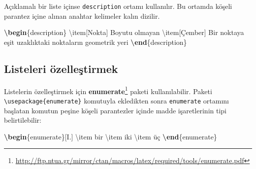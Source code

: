 \documentclass[
  10pt,
]{scrbook}
\newenvironment{Shaded}{}{}
\newcommand{\ExtensionTok}[1]{#1}
\newcommand{\FunctionTok}[1]{\textcolor[rgb]{0.02,0.16,0.49}{#1}}
\newcommand{\KeywordTok}[1]{\textcolor[rgb]{0.00,0.44,0.13}{\textbf{#1}}}
\newcommand{\NormalTok}[1]{#1}
\newcommand{\SpecialCharTok}[1]{\textcolor[rgb]{0.25,0.44,0.63}{#1}}
\newcommand{\SpecialStringTok}[1]{\textcolor[rgb]{0.73,0.40,0.53}{#1}}
\renewcommand{\href}[2]{#2\footnote{\url{#1}}}
\theoremstyle{definition}
\theoremstyle{definition}
\theoremstyle{definition}
\theoremstyle{definition}
\theoremstyle{remark}
\begin{document}
\begin{Shaded}
\end{Shaded}

Açıklamalı bir liste içinse \texttt{description} ortamı kullanılır. Bu ortamda köşeli parantez içine alınan anahtar kelimeler kalın dizilir.

\begin{Shaded}
\begin{Highlighting}[]
\KeywordTok{\textbackslash{}begin}\NormalTok{\{}\ExtensionTok{description}\NormalTok{\}}
  \FunctionTok{\textbackslash{}item}\NormalTok{[Nokta] Boyutu olmayan}
  \FunctionTok{\textbackslash{}item}\NormalTok{[Çember] Bir noktaya eşit}
\NormalTok{  uzaklıktaki noktaların geometrik yeri}
\KeywordTok{\textbackslash{}end}\NormalTok{\{}\ExtensionTok{description}\NormalTok{\}}
\end{Highlighting}
\end{Shaded}

\hypertarget{listeleri-uxf6zelleux15ftirmek}{%
\subsection{Listeleri özelleştirmek}\label{listeleri-uxf6zelleux15ftirmek}}

Listelerin özelleştirmek için \href{http://ftp.ntua.gr/mirror/ctan/macros/latex/required/tools/enumerate.pdf}{\textbf{enumerate}} paketi kullanılabilir. Paketi \texttt{\textbackslash{}usepackage\{enumerate\}} komutuyla ekledikten sonra \texttt{enumerate} ortamını başlatan komutun peşine köşeli parantezler içinde madde işaretlerinin tipi belirtilebilir:

\begin{Shaded}
\begin{Highlighting}[]
\KeywordTok{\textbackslash{}begin}\NormalTok{\{}\ExtensionTok{enumerate}\NormalTok{\}[I.]}
 \FunctionTok{\textbackslash{}item}\NormalTok{ bir}
 \FunctionTok{\textbackslash{}item}\NormalTok{ iki }
 \FunctionTok{\textbackslash{}item}\NormalTok{ üç}
\KeywordTok{\textbackslash{}end}\NormalTok{\{}\ExtensionTok{enumerate}\NormalTok{\}}
\end{Highlighting}
\end{Shaded}
\end{document}
